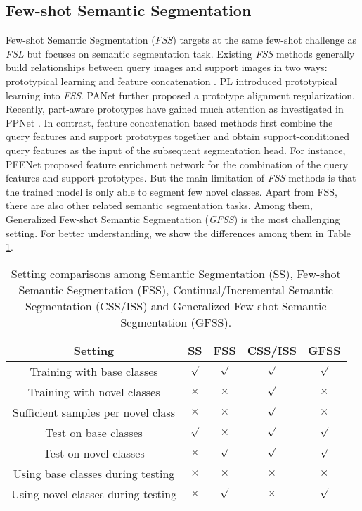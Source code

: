 \documentclass[journal]{IEEEtran}
\begin{document}
\subsection{Few-shot Semantic Segmentation}
Few-shot Semantic Segmentation (\textit{FSS}) targets at the same few-shot challenge as \textit{FSL} but focuses on semantic segmentation task.
Existing \textit{FSS} methods generally build relationships between query images and support images in two ways: prototypical learning \cite{dong2018few,liu2020part,wang2019panet} and feature concatenation \cite{cao2020few,yang2020prototype,zhang2019canet,tian2020prior}.
PL \cite{dong2018few} introduced prototypical learning \cite{snell2017prototypical} into \textit{FSS}.
PANet \cite{wang2019panet} further proposed a prototype alignment regularization.
Recently, part-aware prototypes have gained much attention as investigated in PPNet \cite{liu2020part}. 
In contrast, feature concatenation based methods first combine the query features and support prototypes together and obtain support-conditioned query features as the input of the subsequent segmentation head.
For instance, PFENet \cite{tian2020prior} proposed feature enrichment network for the combination of the query features and support prototypes.
But the main limitation of \textit{FSS} methods is that the trained model is only able to segment few novel classes.
Apart from FSS, there are also other related semantic segmentation tasks.
Among them, Generalized Few-shot Semantic Segmentation (\textit{GFSS}) is the most challenging setting.
For better understanding, we show the differences among them in Table \ref{tab:setting_com}.

\begin{table}[ht]
    \centering
    \caption{Setting comparisons among Semantic Segmentation (SS), Few-shot Semantic Segmentation (FSS), Continual/Incremental Semantic Segmentation (CSS/ISS) and Generalized Few-shot Semantic Segmentation (GFSS).}
\begin{tabular}{c|cccc}
    \hline
         Setting & SS & FSS & CSS/ISS & GFSS  \\
         \hline
         Training with base classes & $\surd$ & $\surd$ & $\surd$ & $\surd$ \\
         Training with novel classes & $\times$ & $\times$ & $\surd$ & $\times$ \\
         Sufficient samples per novel class & $\times$ & $\times$ & $\surd$ & $\times$ \\
         Test on base classes & $\surd$ & $\times$ & $\surd$ & $\surd$ \\
         Test on novel classes & $\times$ & $\surd$ & $\surd$ & $\surd$ \\
         Using base classes during testing & $\times$ & $\times$ & $\times$ & $\times$ \\
         Using novel classes during testing & $\times$ & $\surd$ & $\times$ & $\surd$ \\
    \hline
    \end{tabular}
    \label{tab:setting_com}
\end{table}
\end{document}
